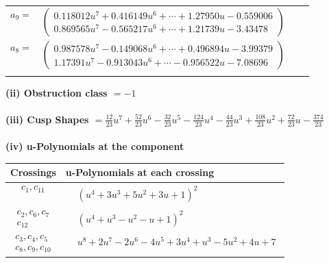 \documentclass[1p]{elsarticle_modified}
\theoremstyle{definition}
\begin{document}
\begin{tabular}{m{7pt} m{180pt} m{7pt} m{180pt} }
\flushright $a_{9}=$&$\begin{pmatrix}0.118012 u^{7}+0.416149 u^{6}+\cdots+1.27950 u-0.559006\\0.869565 u^{7}-0.565217 u^{6}+\cdots+1.21739 u-3.43478\end{pmatrix}$ \\
\flushright $a_{8}=$&$\begin{pmatrix}0.987578 u^{7}-0.149068 u^{6}+\cdots+0.496894 u-3.99379\\1.17391 u^{7}-0.913043 u^{6}+\cdots-0.956522 u-7.08696\end{pmatrix}$\\&\end{tabular}
\flushleft \textbf{(ii) Obstruction class $= -1$}\\~\\
\flushleft \textbf{(iii) Cusp Shapes $= \frac{12}{23} u^7+\frac{52}{23} u^6-\frac{32}{23} u^5-\frac{124}{23} u^4-\frac{44}{23} u^3+\frac{108}{23} u^2+\frac{72}{23} u-\frac{374}{23}$}\\~\\
\newpage\renewcommand{\arraystretch}{1}
\flushleft \textbf{(iv) u-Polynomials at the component}\newline \\
\begin{tabular}{m{50pt}|m{274pt}}
Crossings & \hspace{64pt}u-Polynomials at each crossing \\
\hline $$\begin{aligned}c_{1},c_{11}\end{aligned}$$&$\begin{aligned}
&(u^4+3 u^3+5 u^2+3 u+1)^2
\end{aligned}$\\
\hline $$\begin{aligned}c_{2},c_{6},c_{7}\\c_{12}\end{aligned}$$&$\begin{aligned}
&(u^4+u^3- u^2- u+1)^2
\end{aligned}$\\
\hline $$\begin{aligned}c_{3},c_{4},c_{5}\\c_{8},c_{9},c_{10}\end{aligned}$$&$\begin{aligned}
&u^8+2 u^7-2 u^6-4 u^5+3 u^4+u^3-5 u^2+4 u+7
\end{aligned}$\\
\hline
\end{tabular}\\~\\
\end{document}
